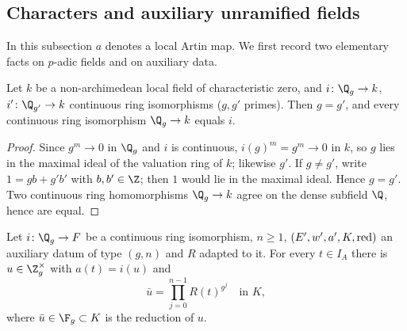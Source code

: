 \subsection{Characters and auxiliary unramified fields}\label{pf:llc:sec-chars}

In this subsection $a$ denotes a local Artin map. We first record two elementary facts on $p$-adic
fields and on auxiliary data.

\begin{lemma}\label{pf:llc:isouniq}
Let $k$ be a non-archimedean local field of characteristic zero, and $i\colon\Q_g\to k$,
$i'\colon\Q_{g'}\to k$ continuous ring isomorphisms ($g,g'$ primes). Then $g=g'$, and every continuous ring
isomorphism $\Q_g\to k$ equals $i$. 
\end{lemma}

\begin{proof}
Since $g^m\to0$ in $\Q_g$ and $i$ is continuous, $i(g)^m=g^m\to0$ in $k$, so $g$ lies in the maximal ideal
of the valuation ring of $k$; likewise $g'$. If $g\ne g'$, write $1=gb+g'b'$ with $b,b'\in\Z$; then $1$
would lie in the maximal ideal. Hence $g=g'$. Two continuous ring homomorphisms $\Q_g\to k$ agree on the
dense subfield $\Q$, hence are equal.
\end{proof}

\begin{lemma}\label{pf:llc:resbase}
Let $i\colon\Q_g\to F$ be a continuous ring isomorphism, $n\ge1$, $(E',w',a',K,\operatorname{red})$ an auxiliary datum of
type $(g,n)$ and $R$ adapted to it. For every $t\in I_A$ there is $u\in\Z_g^\times$ with $a(t)=i(u)$ and
\[
  \bar u=\prod_{j=0}^{n-1}R(t)^{g^j}\quad\text{in }K,
\]
where $\bar u\in\F_g\subset K$ is the reduction of $u$. 
\end{lemma}

